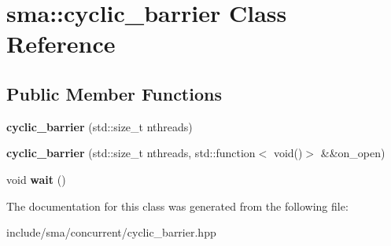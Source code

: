 \hypertarget{classsma_1_1cyclic__barrier}{\section{sma\-:\-:cyclic\-\_\-barrier Class Reference}
\label{classsma_1_1cyclic__barrier}
}
\subsection*{Public Member Functions}
\begin{DoxyCompactItemize}
\item 
\hypertarget{classsma_1_1cyclic__barrier_a7229a41e241bc8efa20a0af724ee2622}{{\bfseries cyclic\-\_\-barrier} (std\-::size\-\_\-t nthreads)}\label{classsma_1_1cyclic__barrier_a7229a41e241bc8efa20a0af724ee2622}

\item 
\hypertarget{classsma_1_1cyclic__barrier_a57d39d4ed0a651c22d6690a31adc8a05}{{\bfseries cyclic\-\_\-barrier} (std\-::size\-\_\-t nthreads, std\-::function$<$ void()$>$ \&\&on\-\_\-open)}\label{classsma_1_1cyclic__barrier_a57d39d4ed0a651c22d6690a31adc8a05}

\item 
\hypertarget{classsma_1_1cyclic__barrier_a870cbe42f23d9116c4e178f4acc77f79}{void {\bfseries wait} ()}\label{classsma_1_1cyclic__barrier_a870cbe42f23d9116c4e178f4acc77f79}

\end{DoxyCompactItemize}


The documentation for this class was generated from the following file\-:\begin{DoxyCompactItemize}
\item 
include/sma/concurrent/cyclic\-\_\-barrier.\-hpp\end{DoxyCompactItemize}
